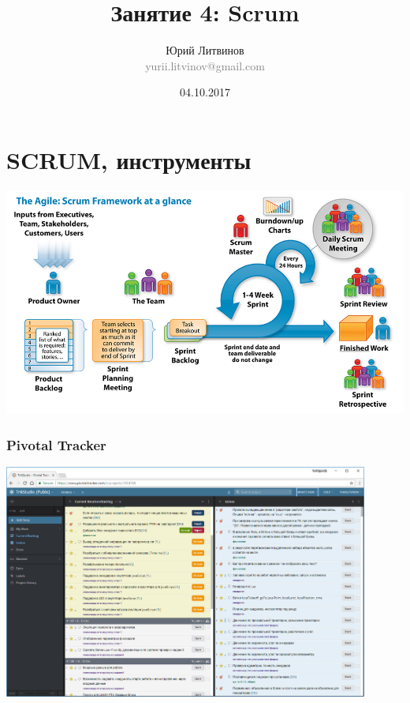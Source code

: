 \documentclass[xetex,mathserif,serif]{beamer}
\title{Занятие 4: Scrum}
\author[Юрий Литвинов]{Юрий Литвинов\\\small{\textcolor{gray}{yurii.litvinov@gmail.com}}}
\date{04.10.2017}
\begin{document}
	\frame{\titlepage}

	\section{SCRUM, инструменты}

	\begin{frame}
		\begin{center}
			\includegraphics[width=\textwidth]{scrum.png}
		\end{center}
	\end{frame}

	\begin{frame}
		\frametitle{Pivotal Tracker}
		\begin{center}
			\includegraphics[width=0.9\textwidth]{pivotalTracker.png}
		\end{center}
	\end{frame}
\end{document}
